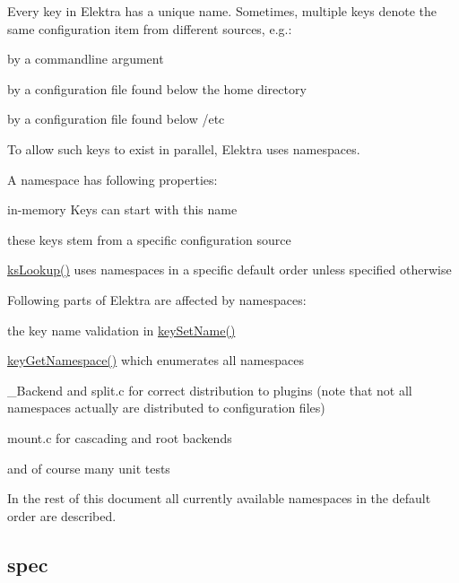 Every key in Elektra has a unique name. Sometimes, multiple keys denote the same configuration item from different sources, e.\+g.\+:


\begin{DoxyItemize}
\item by a commandline argument
\item by a configuration file found below the home directory
\item by a configuration file found below /etc
\end{DoxyItemize}

To allow such keys to exist in parallel, Elektra uses namespaces.

A namespace has following properties\+:


\begin{DoxyItemize}
\item in-\/memory Keys can start with this name
\item these keys stem from a specific configuration source
\item \hyperlink{group__keyset_gaa34fc43a081e6b01e4120daa6c112004}{ks\+Lookup()} uses namespaces in a specific default order unless specified otherwise
\end{DoxyItemize}

Following parts of Elektra are affected by namespaces\+:


\begin{DoxyItemize}
\item the key name validation in \hyperlink{group__keyname_ga7699091610e7f3f43d2949514a4b35d9}{key\+Set\+Name()}
\item \hyperlink{group__api_gafc3ca03ed10f87eb59bdc02cf2a0de8d}{key\+Get\+Namespace()} which enumerates all namespaces
\item \+\_\+\+Backend and split.\+c for correct distribution to plugins (note that not all namespaces actually are distributed to configuration files)
\item mount.\+c for cascading and root backends
\item and of course many unit tests
\end{DoxyItemize}

In the rest of this document all currently available namespaces in the default order are described.

\subsection*{spec}

